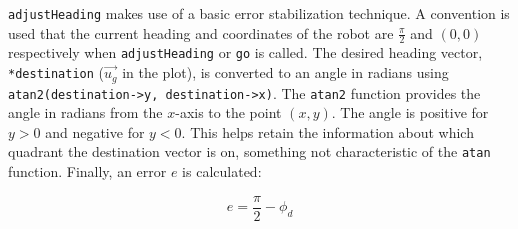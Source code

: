 \documentclass[paper=a4, fontsize=11pt]{scrartcl}
\numberwithin{equation}{section}		%
\numberwithin{figure}{section}			%
\numberwithin{table}{section}				%
\begin{document}
{\begin{center}
\end{center}
\texttt{adjustHeading} makes use of a basic error stabilization technique. A convention is used that the current heading and coordinates of the robot are $\frac{\pi}{2}$ and $(0,0)$ respectively when \texttt{adjustHeading} or \texttt{go} is called. The desired heading vector, \texttt{*destination} ($\vec{u_g}$ in the plot), is converted to an angle in radians using \texttt{atan2(destination->y, destination->x)}. The \texttt{atan2} function provides the angle in radians from the $x$-axis to the point $(x,y)$. The angle is positive for $y>0$ and negative for $y<0$. This helps retain the information about which quadrant the destination vector is on, something not characteristic of the \texttt{atan} function. Finally, an error $e$ is calculated:

$$e = \frac{\pi}{2}-\phi_d$$

}
\end{document}
